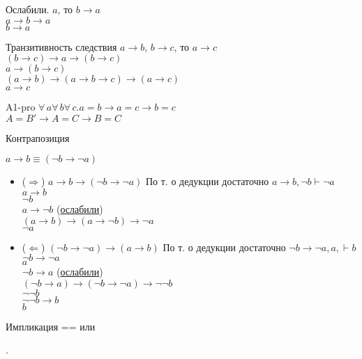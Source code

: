 
Ослабили. \label{easy}
$a$, то $b\to a$\\
$a\to b\to a$\\
$b\to a$

\bigskip

Транзитивность следствия
$a\to b$, $b\to c$, то $a\to c$\\
$(b\to c)\to a\to (b\to c)$\\
$a\to (b\to c)$\\
$(a\to b)\to(a\to b\to c)\to(a\to c)$\\
$a\to c$

\bigskip

A1-pro $\forall\,a\forall\,b\forall\,c.a=b\to a=c \to b=c$\\
$A=B'\to A=C \to B=C$

\bigskip

\hypertarget{conter}{Контрапозиция}
$a\to b\equiv (\neg b\to\neg a)$
\begin{itemize}
	\item ($\Rightarrow$) $a\to b\to (\neg b\to\neg a)$
	По т. о дедукции достаточно $a\to b,\neg b\vdash\neg a$\\
	$a\to b$\\
	$\neg b$\\
	$a\to\neg b$ (\hyperref[easy]{ослабили})\\
	$(a\to b)\to(a\to\neg b)\to\neg a$\\
	$\neg a$
	\item ($\Leftarrow$) $(\neg b\to\neg a)\to (a\to b)$
	По т. о дедукции достаточно $\neg b\to\neg a, a, \vdash b$\\
	$\neg b\to\neg a$\\
	$a$\\
	$\neg b\to a$ (\hyperref[easy]{ослабили})\\
	$(\neg b\to a)\to (\neg b\to \neg a)\to \neg\neg b$\\
	$\neg\neg b$\\
	$\neg\neg b\to b$\\
	$b$
\end{itemize}

\bigskip

\hypertarget{impToOr}{Импликация == или}.

